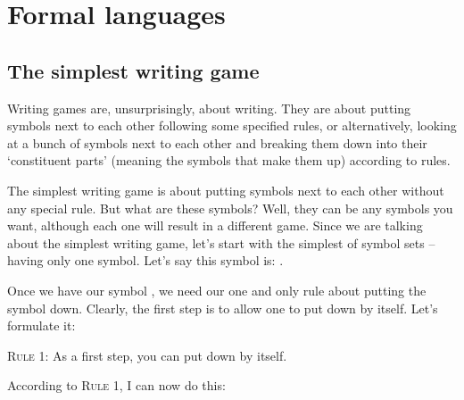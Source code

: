 \chapter{Formal languages}



\section{The simplest writing game}

Writing games are, unsurprisingly, about writing. They are about putting symbols next to each other following some specified rules, or alternatively, looking at a bunch of symbols next to each other and breaking them down into their `constituent parts' (meaning the symbols that make them up) according to rules. 

The simplest writing game is about putting symbols next to each other without any special rule. But what are these symbols? Well, they can be any symbols you want, although each one will result in a different game. Since we are talking about the simplest writing game, let's start with the simplest of symbol sets -- having only one symbol. Let's say this symbol is: \bcirc{}.

\begin{center}
\end{center}

Once we have our symbol \bcirc{}, we need our one and only rule about putting the symbol down. Clearly, the first step is to allow one to put down \bcirc{} by itself. Let's formulate it: 

\textsc{Rule 1:} As a first step, you can put down \bcirc{} by itself. 

According to \textsc{Rule 1}, I can now do this:

\begin{center}
	\bcirc{}
\end{center}

